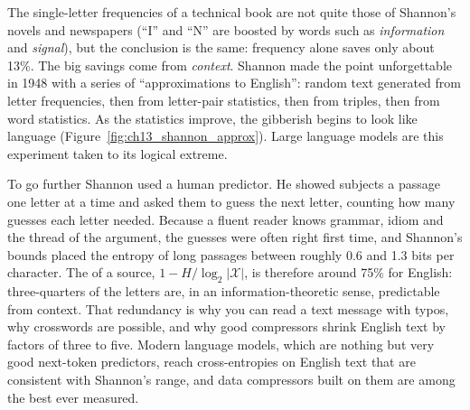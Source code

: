 
The single-letter frequencies of a technical book are not quite those of Shannon's novels and
newspapers (``I'' and ``N'' are boosted by words such as \emph{information} and \emph{signal}),
but the conclusion is the same: frequency alone saves only about 13\%. The big savings come from
\emph{context}. Shannon made the point unforgettable in 1948 with a series of ``approximations to
English'': random text generated from letter frequencies, then from letter-pair statistics, then
from triples, then from word statistics. As the statistics improve, the gibberish begins to look
like language (Figure~\ref{fig:ch13_shannon_approx}). Large language models are this experiment
taken to its logical extreme.


To go further Shannon used a human predictor. He showed subjects a passage one letter at a time
and asked them to guess the next letter, counting how many guesses each letter needed. Because a
fluent reader knows grammar, idiom and the thread of the argument, the guesses were often right
first time, and Shannon's bounds placed the entropy of long passages between roughly 0.6 and 1.3
bits per character. The  of a source, $1-H/\log_2|\mathcal{X}|$, is therefore
around 75\% for English: three-quarters of the letters are, in an information-theoretic sense,
predictable from context. That redundancy is why you can read a text message with typos, why
crosswords are possible, and why good compressors shrink English text by factors of three to
five. Modern language models, which are nothing but very good next-token predictors, reach
cross-entropies on English text that are consistent with Shannon's range, and data compressors
built on them are among the best ever measured.

